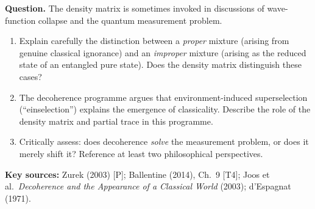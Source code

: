 \documentclass[11pt,a4paper]{article}
\begin{document}
\bigskip

\begin{tcolorbox}[researchbox, title={WRQ 2 --- Foundational: Density Matrix and the Measurement Problem}]

\textbf{Question.}
The density matrix is sometimes invoked in discussions of wave-function collapse
and the quantum measurement problem.

\begin{enumerate}[leftmargin=1.8em, label=(\alph*), itemsep=6pt]
  \item Explain carefully the distinction between a \emph{proper} mixture
        (arising from genuine classical ignorance) and an \emph{improper} mixture
        (arising as the reduced state of an entangled pure state).
        Does the density matrix distinguish these cases?
  \item The decoherence programme argues that environment-induced superselection
        (``einselection'') explains the emergence of classicality.
        Describe the role of the density matrix and partial trace in this programme.
  \item Critically assess: does decoherence \emph{solve} the measurement problem,
        or does it merely shift it? Reference at least two philosophical perspectives.
\end{enumerate}

\medskip\textbf{Key sources:} Zurek (2003) [P]; Ballentine (2014), Ch.~9 [T4];
Joos et al.\ \textit{Decoherence and the Appearance of a Classical World} (2003);
d'Espagnat (1971).
\end{tcolorbox}

\bigskip
\end{document}
